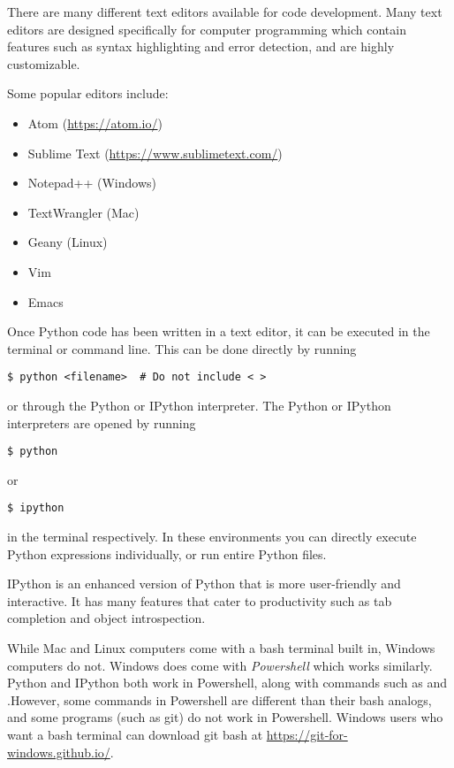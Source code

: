 There are many different text editors available for code development. Many text editors are designed specifically for computer programming which contain features such as syntax highlighting and error detection, and are highly customizable.

Some popular editors include:
\begin{itemize}
\item Atom (\url{https://atom.io/})
\item Sublime Text (\url{https://www.sublimetext.com/})
\item Notepad++ (Windows)
\item TextWrangler (Mac)
\item Geany (Linux)
\item Vim
\item Emacs
\end{itemize}

Once Python code has been written in a text editor, it can be executed in the terminal or command line. This can be done directly by running
\begin{lstlisting}
$ python <filename>  # Do not include < >
\end{lstlisting}
or through the Python or IPython interpreter.
The Python or IPython interpreters are opened by running
\begin{lstlisting}
$ python
\end{lstlisting}
or
\begin{lstlisting}
$ ipython
\end{lstlisting}
in the terminal respectively.
In these environments you can directly execute Python expressions individually, or run entire Python files.

IPython is an enhanced version of Python that is more user-friendly and interactive.
It has many features that cater to productivity such as tab completion and object introspection.

\begin{info}
While Mac and Linux computers come with a bash terminal built in, Windows computers do not. Windows does come with \emph{Powershell} which works similarly. Python and IPython both work in Powershell, along with commands such as  and .However, some commands in Powershell are different than their bash analogs, and some programs (such as git) do not work in Powershell. Windows users who want a bash terminal can download git bash at \url{https://git-for-windows.github.io/}.
\end{info}



